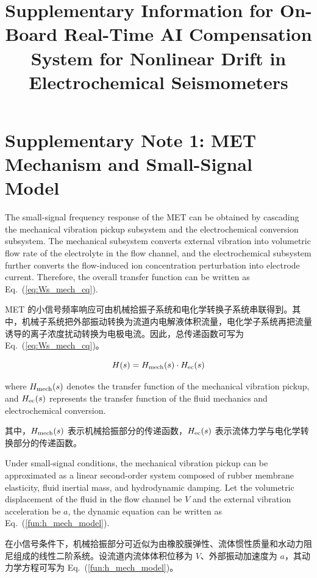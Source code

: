 \documentclass[sn-nature]{sn-jnl}
\newif\ifCNENEnglish
\newif\ifCNENBilingual
\newcommand{\CNEN}[2]{%
    \ifCNENBilingual
        #1%
        \if\relax\detokenize{#2}\relax\else\par #2\fi%
    \else
        \ifCNENEnglish
            #2%
        \else
            #1%
        \fi
    \fi
}
\begin{document}
\title[Supplementary Information]{Supplementary Information for On-Board Real-Time AI Compensation System for Nonlinear Drift in Electrochemical Seismometers}
\maketitle

\section{Supplementary Note 1: MET Mechanism and Small-Signal Model}

\CNEN{MET 的小信号频率响应可由机械拾振子系统和电化学转换子系统串联得到。其中，机械子系统把外部振动转换为流道内电解液体积流量，电化学子系统再把流量诱导的离子浓度扰动转换为电极电流。因此，总传递函数可写为 Eq.~(\ref{eq:Ws_mech_cq})。}{The small-signal frequency response of the MET can be obtained by cascading the mechanical vibration pickup subsystem and the electrochemical conversion subsystem. The mechanical subsystem converts external vibration into volumetric flow rate of the electrolyte in the flow channel, and the electrochemical subsystem further converts the flow-induced ion concentration perturbation into electrode current. Therefore, the overall transfer function can be written as Eq.~(\ref{eq:Ws_mech_cq}).%
}

\begin{equation}\label{eq:Ws_mech_cq}
    H(s)  = H_{\rm mech}(s) \cdot H_{\rm ec}(s)
\end{equation}

\CNEN{其中，$H_{\rm mech}(s)$ 表示机械拾振部分的传递函数，$H_{\rm ec}(s)$ 表示流体力学与电化学转换部分的传递函数。}{where $H_{\rm mech}(s)$ denotes the transfer function of the mechanical vibration pickup, and $H_{\rm ec}(s)$ represents the transfer function of the fluid mechanics and electrochemical conversion.%
}

\CNEN{在小信号条件下，机械拾振部分可近似为由橡胶膜弹性、流体惯性质量和水动力阻尼组成的线性二阶系统。设流道内流体体积位移为 $V$、外部振动加速度为 $a$，其动力学方程可写为 Eq.~(\ref{fun:h_mech_model})。}{Under small-signal conditions, the mechanical vibration pickup can be approximated as a linear second-order system composed of rubber membrane elasticity, fluid inertial mass, and hydrodynamic damping. Let the volumetric displacement of the fluid in the flow channel be $V$ and the external vibration acceleration be $a$, the dynamic equation can be written as Eq.~(\ref{fun:h_mech_model}).%
}
\end{document}
